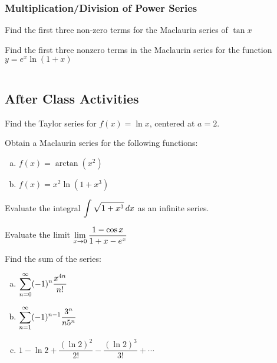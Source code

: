 \documentclass[notes]{subfiles}
\begin{document}
	\subsubsection*{Multiplication/Division of Power Series}
		\begin{ex}
			Find the first three non-zero terms for the Maclaurin series of $\tan x$
		\end{ex}
			\newpage
			
		\begin{ex}
			Find the first three nonzero terms in the Maclaurin series for the function $y = e^x\ln (1+x)$
		\end{ex}
			\[\]
			 \newsec
	\subsection*{After Class Activities}
		\begin{ex}
			Find the Taylor series for $f(x) = \ln x$, centered at $a = 2$.
		\end{ex}
			
		\begin{ex}
			Obtain a Maclaurin series for the following functions:
			\begin{enumerate}[(a)]
				\item $f(x) = \arctan (x^2)$
					\newpage
					
				\item $f(x) = x^2\ln(1+x^3)$
			\end{enumerate}
		\end{ex}
		
		\begin{ex}
			Evaluate the integral $\displaystyle \int \sqrt{1+x^3}\, dx$ as an infinite series.
		\end{ex}
			\vs{1}
			
		\begin{ex}
			Evaluate the limit $\displaystyle \lim_{x\to 0} \dfrac{1-\cos x}{1+x-e^x}$
		\end{ex}
			
		\begin{ex}
			Find the sum of the series:
			\begin{enumerate}[(a)]
				\item $\displaystyle \sum_{n=0}^\infty (-1)^n \dfrac{x^{4n}}{n!}$
					\vs{1}
					\newpage
					
				\item $\displaystyle \sum_{n=1}^\infty (-1)^{n-1}\dfrac{3^n}{n5^n}$
					\vs{1}
					
				\item $1 -\ln 2 + \dfrac{(\ln 2)^2}{2!} - \dfrac{(\ln 2)^3}{3!} + \cdots$
					\vs{1}
			\end{enumerate}
		\end{ex}
\clearpage
\end{document}
